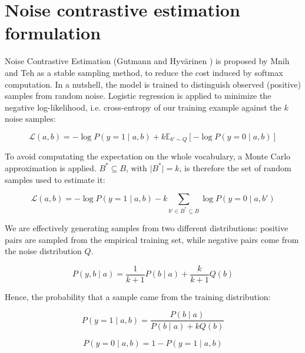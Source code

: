 \documentclass[a4paper,oneside,12pt]{article}
\begin{document}
\section{Noise contrastive estimation formulation}

Noise Contrastive Estimation (Gutmann and Hyvärinen \cite{pmlr-v9-gutmann10a}) is proposed by Mnih and Teh \cite{mnih2012fast} as a stable sampling method, to reduce the cost induced by softmax computation.
In a nutshell, the model is trained to distinguish observed (positive) samples from random noise.
Logistic regression is applied to minimize the negative log-likelihood, i.e. cross-entropy of our training example against the $k$ noise samples:


\begin{equation}
\mathcal{L} (a, b) = - \log P(y = 1 \mid a, b) + k \mathbb{E}_{b' \sim Q}\left[ - \log P(y = 0 \mid a, b) \right]
\end{equation}

To avoid computating the expectation on the whole vocabulary, a Monte Carlo approximation is applied.
$B^* \subseteq B$, with $\vert B^* \vert = k$, is therefore the set of random samples used to estimate it:

\begin{equation}
\mathcal{L} (a, b) = - \log P(y = 1 \mid a, b) - k \sum_{b' \in B^* \subseteq B} \log P(y = 0 \mid a, b')
\end{equation}

We are effectively generating samples from two different distributions: positive pairs are sampled from the empirical training set, while negative pairs come from the noise distribution $Q$.

\begin{equation}
P(y, b \mid a) = \frac{1}{k + 1} P(b \mid a) + \frac{k}{k + 1} Q(b)
\end{equation}

Hence, the probability that a sample came from the training distribution:

\begin{equation}
P(y = 1 \mid a, b) = \frac{P(b \mid a)}{P(b \mid a) + k Q(b)}
\end{equation}

\begin{equation}
P(y = 0 \mid a, b) = 1 - P(y = 1 \mid a, b)
\end{equation}
\end{document}
